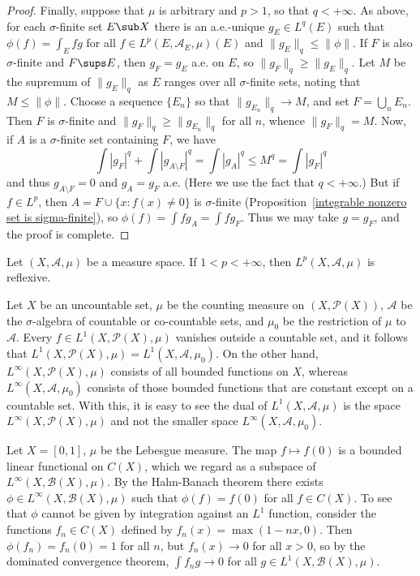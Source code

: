 \begin{proof}
Finally, suppose that $\mu$ is arbitrary and $p>1$, so that $q<+\infty$. As above, for each $\sigma$-finite set $E\sub X$ there is an a.e.-unique $g_E\in L^q(E)$ such that $\phi(f)=\int_Efg$ for all $f\in L^p(E,\mathcal{A}_E,\mu)(E)$ and $\|g_E\|_q\leq\|\phi\|$. If $F$ is also $\sigma$-finite and $F\sups E$, then $g_F=g_E$ a.e. on $E$, so $\|g_F\|_q\geq\|g_E\|_q$. Let $M$ be the supremum of $\|g_E\|_q$ as $E$ ranges over all $\sigma$-finite sets, noting that $M\leq\|\phi\|$. Choose a sequence $\{E_n\}$ so that $\|g_{E_n}\|_q\to M$, and set $F=\bigcup_{n}E_n$. Then $F$ is $\sigma$-finite and $\|g_F\|_q\geq\|g_{E_n}\|_q$ for all $n$, whence $\|g_F\|_q=M$. Now, if $A$ is a $\sigma$-finite set containing $F$, we have
\[\int|g_F|^q+\int|g_{A\setminus F}|^q=\int|g_A|^q\leq M^q=\int|g_F|^q\]
and thus $g_{A\setminus F}=0$ and $g_A=g_F$ a.e. (Here we use the fact that $q<+\infty$.) But if $f\in L^p$, then $A=F\cup\{x:f(x)\neq 0\}$ is $\sigma$-finite (Proposition~\ref{integrable nonzero set is sigma-finite}), so $\phi(f)=\int fg_A=\int fg_F$. Thus we may take $g=g_F$, and the proof is complete.
\end{proof}
\begin{corollary}
Let $(X,\mathcal{A},\mu)$ be a measure space. If $1<p<+\infty$, then $L^p(X,\mathcal{A},\mu)$ is reflexive.
\end{corollary}
\begin{example}
Let $X$ be an uncountable set, $\mu$ be the counting measure on $(X,\mathscr{P}(X))$, $\mathcal{A}$ be the $\sigma$-algebra of countable or co-countable sets, and $\mu_0$ be the restriction of $\mu$ to $\mathcal{A}$. Every $f\in L^1(X,\mathscr{P}(X),\mu)$ vanishes outside a countable set, and it follows that $L^1(X,\mathscr{P}(X),\mu)=L^1(X,\mathcal{A},\mu_0)$. On the other hand, $L^\infty(X,\mathscr{P}(X),\mu)$ consists of all bounded functions on $X$, whereas $L^\infty(X,\mathcal{A},\mu_0)$ consists of those bounded functions that are constant except on a countable set. With this, it is easy to see the dual of $L^1(X,\mathcal{A},\mu)$ is the space $L^\infty(X,\mathscr{P}(X),\mu)$ and not the smaller space $L^\infty(X,\mathcal{A},\mu_0)$.
\end{example}
\begin{example}
Let $X=[0,1]$, $\mu$ be the Lebesgue measure. The map $f\mapsto f(0)$ is a bounded linear functional on $C(X)$, which we regard as a subspace of $L^\infty(X,\mathcal{B}(X),\mu)$. By the Hahn-Banach theorem there exists $\phi\in L^\infty(X,\mathcal{B}(X),\mu)$ such that $\phi(f)=f(0)$ for all $f\in C(X)$. To see that $\phi$ cannot be given by integration against an $L^1$ function, consider the functions $f_n\in C(X)$ defined by $f_n(x)=\max(1-nx,0)$. Then $\phi(f_n)=f_n(0)=1$ for all $n$, but $f_n(x)\to 0$ for all $x>0$, so by the dominated convergence theorem, $\int f_ng\to 0$ for all $g\in L^1(X,\mathcal{B}(X),\mu)$.
\end{example}
